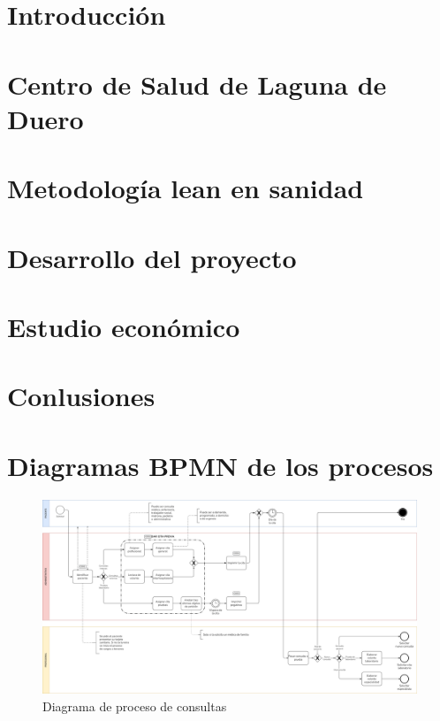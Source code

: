\documentclass[12pt, a4paper, twoside, openright]{report}
\begin{document}
\tableofcontents

\chapter{Introducción}


\chapter{Centro de Salud de Laguna de Duero}


\chapter{Metodología lean en sanidad}


\chapter{Desarrollo del proyecto}


\chapter{Estudio económico}


\chapter{Conlusiones}


\appendix
\chapter{Diagramas BPMN de los procesos }

\begin{figure}
    \centering
    \begin{sideways}
        \includegraphics[width=0.95\textheight]{img/proceso-consultas.png}
    \end{sideways}
    \caption{Diagrama de proceso de consultas}
    \label{fig:proceso-consultas}
\end{figure}
\end{document}
